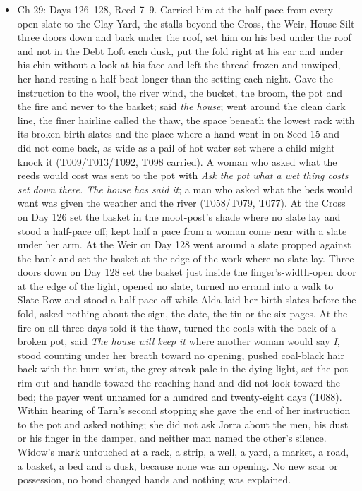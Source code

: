 \documentclass{design/chronicle}
\begin{document}
{\begin{itemize}[leftmargin=1.4em,itemsep=1pt,topsep=3pt,parsep=0pt]
\item Ch 29: Days 126–128, Reed 7–9. Carried him at the half-pace from every open slate to the Clay Yard, the stalls beyond the Cross, the Weir, House Silt three doors down and back under the roof, set him on his bed under the roof and not in the Debt Loft each dusk, put the fold right at his ear and under his chin without a look at his face and left the thread frozen and unwiped, her hand resting a half-beat longer than the setting each night. Gave the instruction to the wool, the river wind, the bucket, the broom, the pot and the fire and never to the basket; said \emph{the house}; went around the clean dark line, the finer hairline called the thaw, the space beneath the lowest rack with its broken birth-slates and the place where a hand went in on Seed 15 and did not come back, as wide as a pail of hot water set where a child might knock it (T009/T013/T092, T098 carried). A woman who asked what the reeds would cost was sent to the pot with \emph{Ask the pot what a wet thing costs set down there. The house has said it}; a man who asked what the beds would want was given the weather and the river (T058/T079, T077). At the Cross on Day 126 set the basket in the moot-post’s shade where no slate lay and stood a half-pace off; kept half a pace from a woman come near with a slate under her arm. At the Weir on Day 128 went around a slate propped against the bank and set the basket at the edge of the work where no slate lay. Three doors down on Day 128 set the basket just inside the finger’s-width-open door at the edge of the light, opened no slate, turned no errand into a walk to Slate Row and stood a half-pace off while Alda laid her birth-slates before the fold, asked nothing about the sign, the date, the tin or the six pages. At the fire on all three days told it the thaw, turned the coals with the back of a broken pot, said \emph{The house will keep it} where another woman would say \emph{I}, stood counting under her breath toward no opening, pushed coal-black hair back with the burn-wrist, the grey streak pale in the dying light, set the pot rim out and handle toward the reaching hand and did not look toward the bed; the payer went unnamed for a hundred and twenty-eight days (T088). Within hearing of Tarn’s second stopping she gave the end of her instruction to the pot and asked nothing; she did not ask Jorra about the men, his dust or his finger in the damper, and neither man named the other’s silence. Widow’s mark untouched at a rack, a strip, a well, a yard, a market, a road, a basket, a bed and a dusk, because none was an opening. No new scar or possession, no bond changed hands and nothing was explained.

\end{itemize}
}
\end{document}
